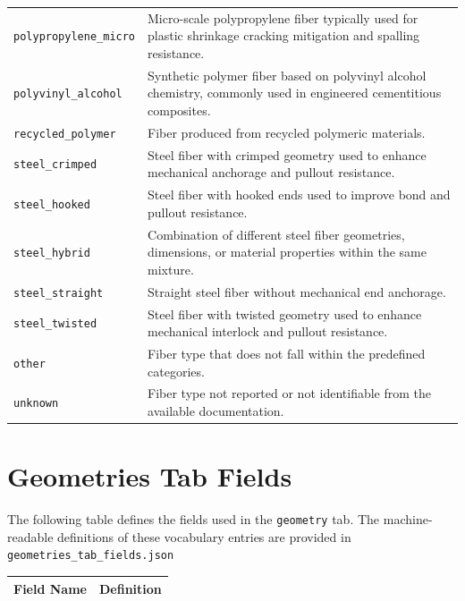 \documentclass[11pt]{book}
\begin{document}
{\begin{longtable}{p{}p{}}
\texttt{polypropylene\_micro} &
Micro-scale polypropylene fiber typically used for plastic shrinkage cracking mitigation and spalling resistance. \\

\texttt{polyvinyl\_alcohol} &
Synthetic polymer fiber based on polyvinyl alcohol chemistry, commonly used in engineered cementitious composites. \\

\texttt{recycled\_polymer} &
Fiber produced from recycled polymeric materials. \\

\texttt{steel\_crimped} &
Steel fiber with crimped geometry used to enhance mechanical anchorage and pullout resistance. \\

\texttt{steel\_hooked} &
Steel fiber with hooked ends used to improve bond and pullout resistance. \\

\texttt{steel\_hybrid} &
Combination of different steel fiber geometries, dimensions, or material properties within the same mixture. \\

\texttt{steel\_straight} &
Straight steel fiber without mechanical end anchorage. \\

\texttt{steel\_twisted} &
Steel fiber with twisted geometry used to enhance mechanical interlock and pullout resistance. \\

\texttt{other} &
Fiber type that does not fall within the predefined categories. \\

\texttt{unknown} &
Fiber type not reported or not identifiable from the available documentation. \\

\hline
\end{longtable}


\section{Geometries Tab Fields}
\label{vocab:geometry_fields_tab}

The following table defines the fields used in the \texttt{geometry} tab. The machine-readable definitions of these vocabulary entries are provided in \texttt{geometries\_tab\_fields.json}

\begin{longtable}{p{}p{}}
\hline
\textbf{Field Name} & \textbf{Definition} \\
\hline
\endfirsthead


\end{longtable}}
\end{document}
